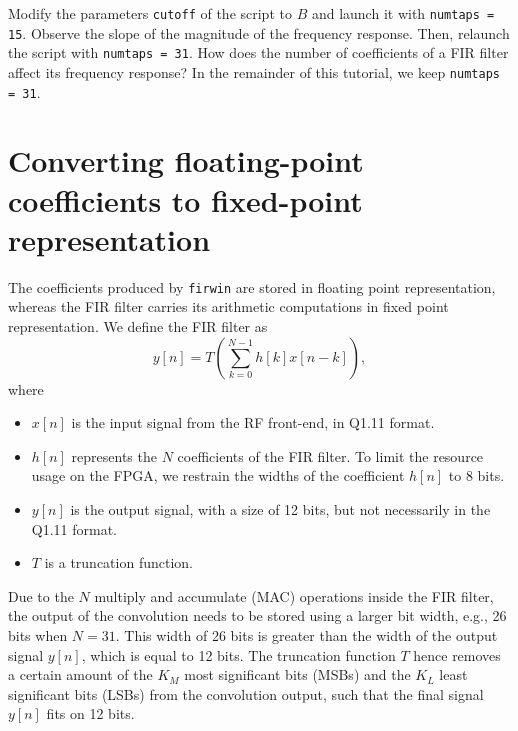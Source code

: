 Modify the parameters \texttt{cutoff} of the script to $B$ and launch it with \texttt{numtaps = 15}. Observe the slope of the magnitude of the frequency response. Then, relaunch the script with \texttt{numtaps = 31}. How does the number of coefficients of a FIR filter affect its frequency response? In the remainder of this tutorial, we keep \texttt{numtaps = 31}.

\section{Converting floating-point coefficients to fixed-point representation}

The coefficients produced by \texttt{firwin} are stored in floating point representation, whereas the FIR filter carries its arithmetic computations in fixed point representation.
We define the FIR filter as \\
\begin{equation}
    y[n] = T\left( \sum^{N-1}_{k=0} h[k] x[n-k] \right),
\end{equation}
where
\begin{itemize}
    \item $x[n]$ is the input signal from the RF front-end, in Q1.11 format.
    \item $h[n]$ represents the $N$ coefficients of the FIR filter. To limit the resource usage on the FPGA, we restrain the widths of the coefficient $h[n]$ to 8 bits.
    \item $y[n]$ is the output signal, with a size of 12 bits, but not necessarily in the Q1.11 format.
    \item $T$ is a truncation function.
\end{itemize}

Due to the $N$ multiply and accumulate (MAC) operations inside the FIR filter, the output of the convolution needs to be stored using a larger bit width, e.g., 26 bits when $N = 31$. This width of 26 bits is greater than the width of the output signal $y[n]$, which is equal to 12 bits. The truncation function $T$ hence removes a certain amount of the $K_M$ most significant bits (MSBs) and the $K_L$ least significant bits (LSBs) from the convolution output, such that the final signal $y[n]$ fits on 12 bits.

